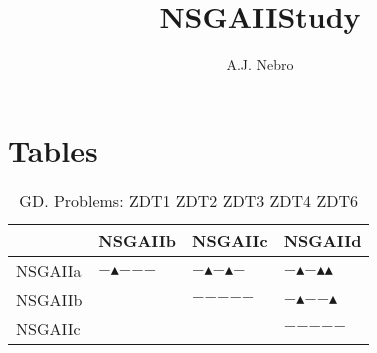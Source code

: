 \documentclass{article}
\title{NSGAIIStudy}
\author{A.J. Nebro}
\begin{document}
\maketitle
\section{Tables}

\begin{table}
\caption{GD. Problems: ZDT1 ZDT2 ZDT3 ZDT4 ZDT6 }
\label{table: GD}
\centering
\begin{scriptsize}
\begin{tabular}{llll}
\hline 
 &  NSGAIIb &  NSGAIIc &  NSGAIId\\
\hline 
 NSGAIIa & $-$$\blacktriangle$$-$$-$$-$ & $-$$\blacktriangle$$-$$\blacktriangle$$-$ & $-$$\blacktriangle$$-$$\blacktriangle$$\blacktriangle$\\
 NSGAIIb &  & $-$$-$$-$$-$$-$ & $-$$\blacktriangle$$-$$-$$\blacktriangle$\\
 NSGAIIc &  &  & $-$$-$$-$$-$$-$\\
\hline
\end{tabular}
\end{scriptsize}
\end{table}
\end{document}
